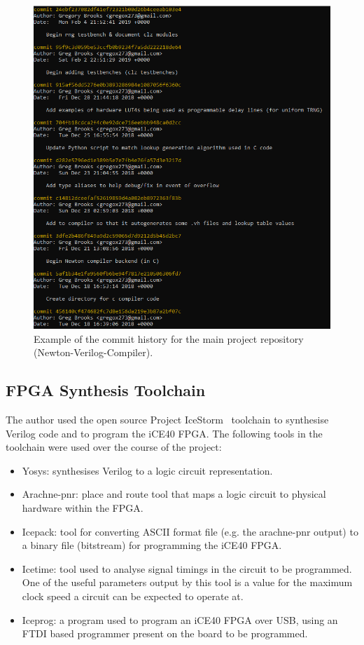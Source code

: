 \documentclass[12pt]{article}
\begin{document}
    \begin{figure}[H]
      \centering
      \includegraphics[width=\textwidth]{fig/commits.png}
      \caption{Example of the commit history for the main project repository (Newton-Verilog-Compiler).}
      \label{fig:commits}
    \end{figure}
    \clearpage

  \subsection{FPGA Synthesis Toolchain}
    The author used the open source Project IceStorm~\cite{icestorm} toolchain to synthesise Verilog code and to program the iCE40 FPGA. The following tools in the toolchain were used over the course of the project:
    \begin{itemize}
      \item Yosys: synthesises Verilog to a logic circuit representation.
      \item Arachne-pnr: place and route tool that maps a logic circuit to physical hardware within the FPGA.
      \item Icepack: tool for converting ASCII format file (e.g. the arachne-pnr output) to a binary file (bitstream) for programming the iCE40 FPGA.
      \item Icetime: tool used to analyse signal timings in the circuit to be programmed. One of the useful parameters output by this tool is a value for the maximum clock speed a circuit can be expected to operate at.
      \item Iceprog: a program used to program an iCE40 FPGA over USB, using an FTDI based programmer present on the board to be programmed.
    \end{itemize}
\end{document}
